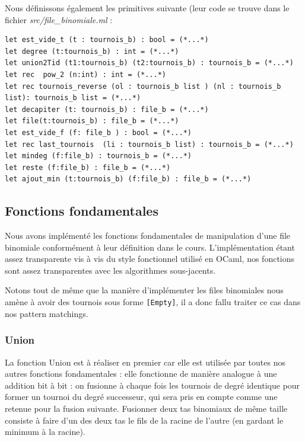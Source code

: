 \documentclass[12pt,a4paper]{article}
\begin{document}
Nous définissons également les primitives suivante (leur code se trouve dans le fichier \textit{src/file\_binomiale.ml} :

\bigskip \begin{lstlisting}
let est_vide_t (t : tournois_b) : bool = (*...*)
let degree (t:tournois_b) : int = (*...*)
let union2Tid (t1:tournois_b) (t2:tournois_b) : tournois_b = (*...*)
let rec  pow_2 (n:int) : int = (*...*)
let rec tournois_reverse (ol : tournois_b list ) (nl : tournois_b list): tournois_b list = (*...*)
let decapiter (t: tournois_b) : file_b = (*...*)
let file(t:tournois_b) : file_b = (*...*)
let est_vide_f (f: file_b ) : bool = (*...*)
let rec last_tournois  (li : tournois_b list) : tournois_b = (*...*)
let mindeg (f:file_b) : tournois_b = (*...*)
let reste (f:file_b) : file_b = (*...*)
let ajout_min (t:tournois_b) (f:file_b) : file_b = (*...*)
\end{lstlisting} \bigskip

\subsection{Fonctions fondamentales}
Nous avons implémenté les fonctions fondamentales de manipulation d'une file binomiale conformément à leur définition dans le cours. L'implémentation étant assez transparente vis à vis du style fonctionnel utilisé en OCaml, nos fonctions sont assez transparentes avec les algorithmes sous-jacents.

Notons tout de même que la manière d'implémenter les files binomiales nous amène à avoir des tournois sous forme \texttt{[Empty]}, il a donc fallu traiter ce cas dans nos pattern matchings.

\subsubsection{Union}

La fonction Union est à réaliser en premier car elle est utilisée par toutes nos autres fonctions fondamentales : elle fonctionne de manière analogue à une addition bit à bit : on fusionne à chaque fois les tournois de degré identique pour former un tournoi du degré successeur, qui sera pris en compte comme une retenue pour la fusion suivante. Fusionner deux tas binomiaux de même taille consiste à faire d'un des deux tas le fils de la racine de l'autre (en gardant le minimum à la racine).
\end{document}
